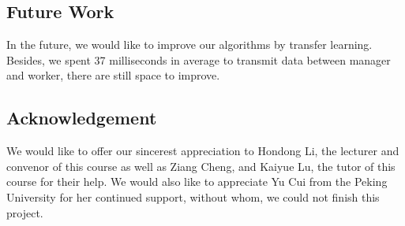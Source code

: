 \documentclass[runningheads]{llncs}
\begin{document}
\subsection{Future Work}

In the future, we would like to improve our algorithms by 
transfer learning. Besides, we spent 37 milliseconds in 
average to transmit data between manager and worker, there 
are still space to improve. 

\subsection{Acknowledgement}
We would like to offer our sincerest appreciation to 
Hondong Li, the lecturer and convenor of this course as 
well as Ziang Cheng, and Kaiyue Lu, the tutor of this 
course for their help. We would also like to appreciate 
Yu Cui from the Peking University for her continued support, 
without whom, we could not finish this project. 
\end{document}
